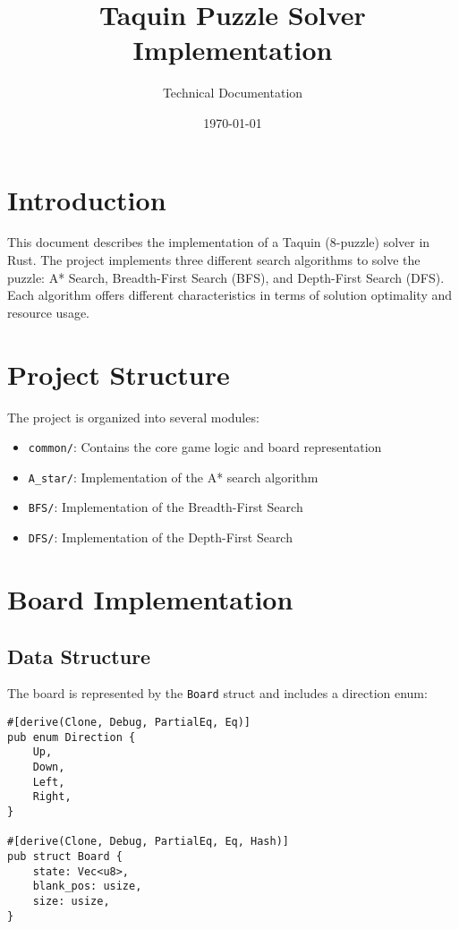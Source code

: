 \documentclass[a4paper]{article}
\title{Taquin Puzzle Solver Implementation}
\author{Technical Documentation}
\date{\today}
\begin{document}
\maketitle

\tableofcontents

\section{Introduction}
This document describes the implementation of a Taquin (8-puzzle) solver in Rust. The project implements three different search algorithms to solve the puzzle: A* Search, Breadth-First Search (BFS), and Depth-First Search (DFS). Each algorithm offers different characteristics in terms of solution optimality and resource usage.

\section{Project Structure}
The project is organized into several modules:
\begin{itemize}
    \item \texttt{common/}: Contains the core game logic and board representation
    \item \texttt{A\_star/}: Implementation of the A* search algorithm
    \item \texttt{BFS/}: Implementation of the Breadth-First Search
    \item \texttt{DFS/}: Implementation of the Depth-First Search
\end{itemize}

\section{Board Implementation}
\subsection{Data Structure}
The board is represented by the \texttt{Board} struct and includes a direction enum:

\begin{lstlisting}[style=rustcode]
#[derive(Clone, Debug, PartialEq, Eq)]
pub enum Direction {
    Up,
    Down,
    Left,
    Right,
}

#[derive(Clone, Debug, PartialEq, Eq, Hash)]
pub struct Board {
    state: Vec<u8>,
    blank_pos: usize,
    size: usize,
}
\end{lstlisting}
\end{document}
